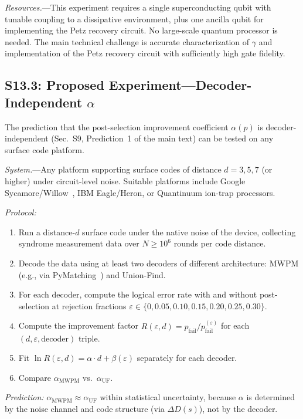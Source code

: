 \documentclass[prl,twocolumn,superscriptaddress,longbibliography]{revtex4-2}
\begin{document}
\emph{Resources.}---This experiment requires a single superconducting
qubit with tunable coupling to a dissipative environment, plus one
ancilla qubit for implementing the Petz recovery circuit. No
large-scale quantum processor is needed. The main technical challenge
is accurate characterization of $\gamma$ and implementation of the
Petz recovery circuit with sufficiently high gate fidelity.

\subsection{S13.3: Proposed Experiment---Decoder-Independent $\alpha$}

The prediction that the post-selection improvement coefficient
$\alpha(p)$ is decoder-independent (Sec.~S9, Prediction~1 of the
main text) can be tested on any surface code platform.

\emph{System.}---Any platform supporting surface codes of distance
$d = 3, 5, 7$ (or higher) under circuit-level noise. Suitable
platforms include Google Sycamore/Willow~\cite{Acharya2025}, IBM
Eagle/Heron, or Quantinuum ion-trap processors.

\emph{Protocol:}
\begin{enumerate}
\item Run a distance-$d$ surface code under the native noise of the
  device, collecting syndrome measurement data over $N \geq 10^6$
  rounds per code distance.
\item Decode the data using at least two decoders of different
  architecture: MWPM (e.g., via PyMatching~\cite{Higgott2025}) and
  Union-Find.
\item For each decoder, compute the logical error rate with and without
  post-selection at rejection fractions
  $\varepsilon \in \{0, 0.05, 0.10, 0.15, 0.20, 0.25, 0.30\}$.
\item Compute the improvement factor
  $R(\varepsilon, d) = p_{\mathrm{fail}} / p_{\mathrm{fail}}^{(\varepsilon)}$
  for each $(d, \varepsilon, \text{decoder})$ triple.
\item Fit $\ln R(\varepsilon, d) = \alpha \cdot d + \beta(\varepsilon)$
  separately for each decoder.
\item Compare $\alpha_{\mathrm{MWPM}}$ vs.\ $\alpha_{\mathrm{UF}}$.
\end{enumerate}

\emph{Prediction:} $\alpha_{\mathrm{MWPM}} \approx \alpha_{\mathrm{UF}}$
within statistical uncertainty, because $\alpha$ is determined by the
noise channel and code structure (via $\Delta D(s)$), not by the
decoder.
\end{document}
